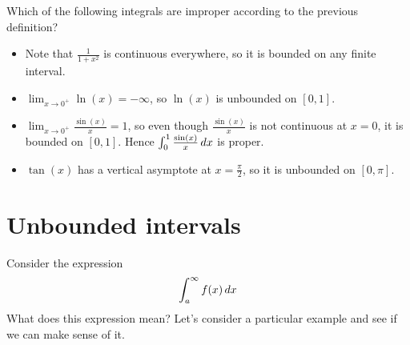 \documentclass{ximera}
\begin{document}
\begin{question}
  Which of the following integrals are improper according to the previous definition?
  \begin{selectAll}
  \end{selectAll}

\begin{feedback}
\begin{itemize}
\item Note that $\frac{1}{1+x^2}$ is continuous everywhere, so it is bounded on any finite interval. 
\item $\lim_{x \to 0^+} \ln(x) = -\infty$, so $\ln(x)$ is unbounded on $[0,1]$.
\item $\lim_{x \to 0^+} \frac{\sin(x)}{x} = 1$, so even though $\frac{\sin(x)}{x}$ is not continuous at $x=0$, it is bounded on $[0,1]$.  Hence $\int_0^1 \frac{\sin(x)}{x} \mathop{}\!d x$ is proper.
\item $\tan(x)$ has a vertical asymptote at $x=\frac{\pi}{2}$, so it is unbounded on $[0,\pi]$.
\end{itemize}
\end{feedback}
\end{question}





\section{Unbounded intervals}


Consider the expression
\[ 
\int_{a}^{\infty} f(x) \mathop{}\!d x
\]
What does this expression mean?  Let's consider a particular example and see if we can make sense of it.
\end{document}
